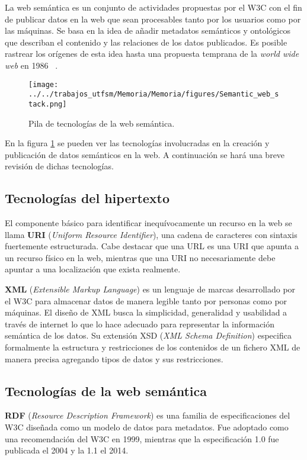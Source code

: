\documentclass[spanish, fleqn, twocolumn]{IEEEtran/IEEEtran}
\renewcommand{\bf}[1]{\textbf{#1}}
\begin{document}
La web semántica es un conjunto de actividades propuestas por el W3C con el fin
de publicar datos en la web que sean procesables tanto por los usuarios como por
las máquinas. Se basa en la idea de añadir metadatos semánticos y ontológicos
que describan el contenido y las relaciones de los datos publicados. 
Es posible rastrear los orígenes de esta idea hasta una propuesta temprana de la
\emph{world wide web} en 1986 ~\cite{berners1989proposal}.

\begin{figure}[htpb]
  \centering
  \texttt{[image: ../../trabajos\_utfsm/Memoria/Memoria/figures/Semantic\_web\_stack.png]}
  \caption{Pila de tecnologías de la web semántica\cite{wikimg:swstack}.}
  \label{fig:swstack}
\end{figure}

En la figura \ref{fig:swstack} se pueden ver las tecnologías involucradas en la
creación y publicación de datos semánticos en la web. A continuación se hará una
breve revisión de dichas tecnologías.

\newpage
{}

\subsection{Tecnologías del hipertexto}
El componente básico para identificar inequívocamente un recurso en la web se
llama \bf{URI}\cite{berners2004uniform} (\emph{Uniform Resource Identifier}), 
una cadena de caracteres con sintaxis fuertemente estructurada. Cabe destacar
que una URL es una URI que apunta a un recurso físico en la web, mientras que
una URI no necesariamente debe apuntar a una localización que exista realmente.

\bf{XML} (\emph{Extensible Markup Language}) es un
lenguaje de marcas desarrollado por el W3C para almacenar datos de manera
legible tanto por personas como por máquinas. 
El diseño de XML busca la simplicidad, generalidad y usabilidad a través de
internet\cite{paoli2004extensible} lo que lo hace adecuado para representar la
información semántica de los datos. Su extensión XSD (\emph{XML Schema
Definition}) especifica formalmente la estructura y restricciones de los
contenidos de un fichero XML de manera precisa agregando tipos de datos y sus
restricciones\cite{biron2004xml}.

\subsection{Tecnologías de la web semántica}
\bf{RDF} (\emph{Resource Description Framework}) es una familia de
especificaciones del W3C diseñada como un modelo de datos para metadatos.
Fue adoptado como una recomendación del W3C en 1999, mientras que la
especificación 1.0 fue publicada el 2004 y la 1.1 el
2014\cite{bikakis2013semantic}.
\end{document}

